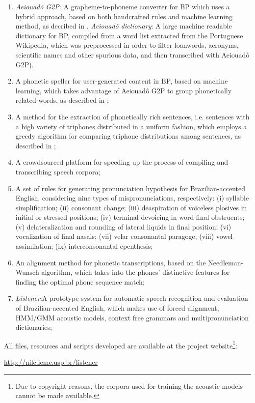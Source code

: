 \begin{enumerate}
 \item \emph{Aeiouad\^o G2P}: A grapheme-to-phoneme converter for \ac{BP} which uses a hybrid approach, based on both handcrafted rules and machine learning method, as decribed in \citeauthor{Mendonca2014} \cite{Mendonca2014}. \emph{Aeiouad\^o dictionary}: A large machine readable dictionary for \ac{BP}, compiled from a word list extracted from the Portuguese Wikipedia, which was preprocessed in order to filter loanwords, acronyms, scientific names and other spurious data, and then transcribed with Aeiouad\^o G2P).
 \item A phonetic speller for user-generated content in \ac{BP}, based on machine learning, which takes advantage of Aeiouad\^o G2P to group phonetically related words, as described in \citeauthor{Mendonca2015} \cite{Mendonca2015}; 
 \item A method for the extraction of phonetically rich sentences, i.e. sentences with a high variety of triphones distributed in a uniform fashion, which employs a greedy algorithm for comparing triphone distributions among sentences, as described in \citeauthor{Mendonca2014b} \cite{Mendonca2014b};
 \item A crowdsourced platform for speeding up the process of compiling and transcribing speech corpora;
 \item A set of rules for generating pronunciation hypothesis for Brazilian-accented English, considering nine types of mispronunciations, respectively: (i) syllable simplification; (ii) consonant change; (iii) deaspiration of voiceless plosives in initial or stressed positions; (iv) terminal devoicing in word-final obstruents; (v) delateralization and rounding of lateral liquids in final position; (vi) vocalization of final nasals; (vii) velar consonantal paragoge; (viii) vowel assimilation; (ix) interconsonantal epenthesis;
 \item An alignment method for phonetic transcriptions, based on the Needleman-Wunsch algorithm,  which takes into the phones' distinctive features for finding the optimal phone sequence match;
 \item \emph{Listener}:A prototype system for automatic speech recognition and evaluation of Brazilian-accented English, which makes use of forced alignment, \ac{HMM}/\ac{GMM} acoustic models, context free grammars and multipronunciation dictionaries;
\end{enumerate}

All files, resources and scripts developed are available at the project website\footnote{Due to copyright reasons, the corpora used for training the acoustic models cannot be made available.}: 
\begin{center}
 \url{http://nilc.icmc.usp.br/listener}
\end{center}

